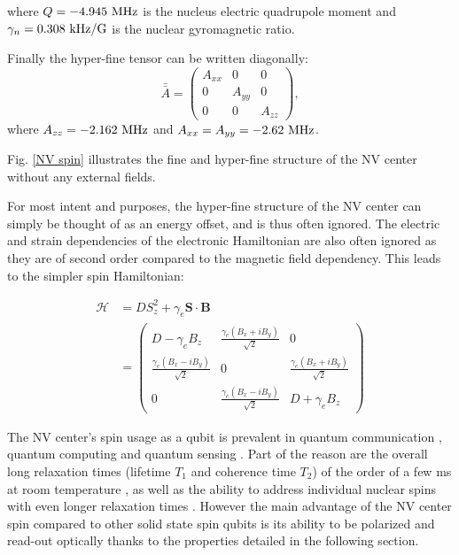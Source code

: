 \documentclass[a4paper,11pt]{report}
\begin{document}
where $Q=-4.945\ \rm MHz$ is the nucleus electric quadrupole moment and $\gamma_n=0.308\ \rm kHz/G$ is the nuclear gyromagnetic ratio.

Finally the hyper-fine tensor can be written diagonally:
\begin{equation}
\bar{\bar{A}} = \begin{pmatrix}
A_{xx} & 0 & 0 \\
0 & A_{yy} & 0 \\
0 & 0 & A_{zz}
\end{pmatrix},
\end{equation}
where $A_{zz}=-2.162\ \rm MHz$ and $A_{xx}=A_{yy}=-2.62\ \rm MHz$.

Fig. \ref{NV spin} illustrates the fine and hyper-fine structure of the NV center without any external fields.

For most intent and purposes, the hyper-fine structure of the NV center can simply be thought of as an energy offset, and is thus often ignored. The electric and strain dependencies of the electronic Hamiltonian are also often ignored as they are of second order compared to the magnetic field dependency. This leads to the simpler spin Hamiltonian:

\begin{align}
\label{NV spin Hamiltonian basic}
\mathcal{H}&=D S_z^2 + \gamma_e \mathbf{S} \cdot \mathbf{B} \\
&=\begin{pmatrix}
D-\gamma_e B_z & \frac{\gamma_e (B_x+iB_y)}{\sqrt{2}} & 0 \\
\frac{\gamma_e (B_x-iB_y)}{\sqrt{2}} & 0 & \frac{\gamma_e (B_x+iB_y)}{\sqrt{2}} \\
0 & \frac{\gamma_e (B_x-iB_y)}{\sqrt{2}} & D+\gamma_e B_z
\end{pmatrix}
\end{align}

\bigskip
The NV center's spin usage as a qubit is prevalent in quantum communication \citep{wehner2018quantum}, quantum computing \citep{de2021materials} and quantum sensing \citep{degen2017quantum}. Part of the reason are the overall long relaxation times (lifetime $T_1$ and coherence time $T_2$) of the order of a few ms at room temperature \citep{balasubramanian2009ultralong}, as well as the ability to address individual nuclear spins with even longer relaxation times \citep{awschalom2018quantum}. However the main advantage of the NV center spin compared to other solid state spin qubits is its ability to be polarized and read-out optically thanks to the properties detailed in the following section.
\end{document}
